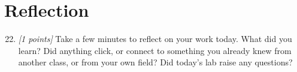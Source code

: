 \documentclass[11pt]{article}
\begin{document}
\section{Reflection}

\begin{enumerate}
    \setcounter{enumi}{21}
\item \textit{[1 points]} Take a few minutes to reflect on your work today. What did you learn? Did
anything click, or connect to something you already knew from another
class, or from your own field? Did today's lab raise any questions? 
\end{enumerate}
\end{document}
